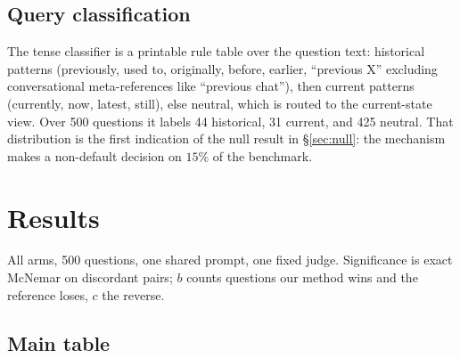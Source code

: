 \documentclass[11pt]{article}
\begin{document}
\subsection{Query classification}
\label{sec:classifier}

The tense classifier is a printable rule table over the question text: historical patterns (previously, used to, originally, before, earlier, ``previous X'' excluding conversational meta-references like ``previous chat''), then current patterns (currently, now, latest, still), else neutral, which is routed to the current-state view. Over 500 questions it labels 44 historical, 31 current, and 425 neutral. That distribution is the first indication of the null result in \S\ref{sec:null}: the mechanism makes a non-default decision on $15\%$ of the benchmark.

\section{Results}
\label{sec:results}

All arms, 500 questions, one shared prompt, one fixed judge. Significance is exact McNemar on discordant pairs; $b$ counts questions our method wins and the reference loses, $c$ the reverse.

\subsection{Main table}
\end{document}
